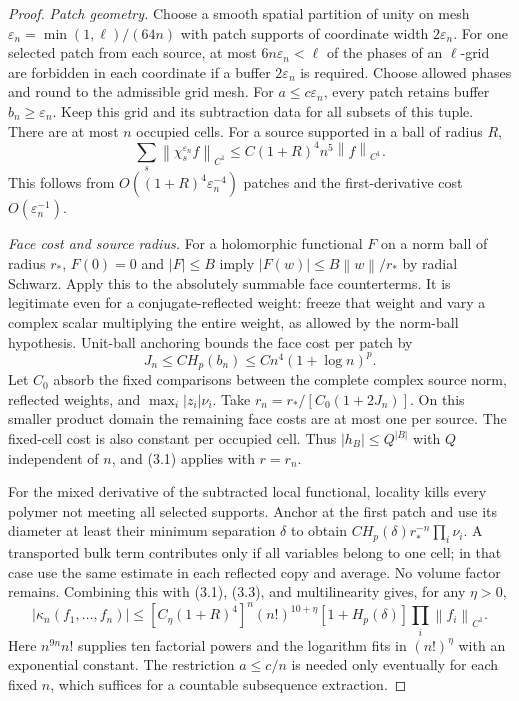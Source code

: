 \documentclass[11pt]{article}
\theoremstyle{remark}
\newcommand{\norm}[1]{\left\|#1\right\|}
\begin{document}
\begin{proof}
\emph{Patch geometry.}
Choose a smooth spatial partition of unity on mesh
$\varepsilon_n=\min(1,\ell)/(64n)$ with patch supports of coordinate
width $2\varepsilon_n$. For one selected patch from each source,
at most $6n\varepsilon_n<\ell$ of the phases of an $\ell$-grid are
forbidden in each coordinate if a buffer $2\varepsilon_n$ is required.
Choose allowed phases and round to the admissible grid mesh. For
$a\leq c\varepsilon_n$, every patch retains buffer
$b_n\geq\varepsilon_n$. Keep this grid and its subtraction data for
all subsets of this tuple. There are at most $n$ occupied cells.
For a source supported in a ball of radius $R$,
\[
 \sum_s\norm{\chi_s^{\varepsilon_n}f}_{C^1}
 \leq C(1+R)^4 n^5\norm f_{C^1}.
 \tag{3.3}
\]
This follows from $O((1+R)^4\varepsilon_n^{-4})$ patches and the
first-derivative cost $O(\varepsilon_n^{-1})$.

\emph{Face cost and source radius.}
For a holomorphic functional $F$ on a norm ball of radius $r_*$,
$F(0)=0$ and $|F|\leq B$ imply
$|F(w)|\leq B\norm w/r_*$ by radial Schwarz.
Apply this to the absolutely summable face counterterms. It is
legitimate even for a conjugate-reflected weight: freeze that weight
and vary a complex scalar multiplying the entire weight, as allowed
by the norm-ball hypothesis. Unit-ball anchoring bounds the face cost
per patch by
\[
 J_n\leq C H_p(b_n)\leq Cn^4(1+\log n)^p.
\]
Let $C_0$ absorb the fixed comparisons between the complete complex
source norm, reflected weights, and $\max_i|z_i|\nu_i$.
Take $r_n=r_*/[C_0(1+2J_n)]$. On this smaller product domain the remaining
face costs are at most one per source. The fixed-cell cost is also
constant per occupied cell. Thus $|h_B|\leq Q^{|B|}$ with $Q$
independent of $n$, and (3.1) applies with $r=r_n$.

For the mixed derivative of the subtracted local functional, locality
kills every polymer not meeting all selected supports. Anchor at the
first patch and use its diameter at least their minimum separation
$\delta$ to obtain $C H_p(\delta)r_*^{-n}\prod_i\nu_i$.
A transported bulk term contributes only if all variables belong to
one cell; in that case use the same estimate in each reflected copy
and average. No volume factor remains.
Combining this with (3.1), (3.3), and multilinearity gives, for any
$\eta>0$,
\[
 |\kappa_n(f_1,\ldots,f_n)|
 \leq[C_\eta(1+R)^4]^n(n!)^{10+\eta}
       [1+H_p(\delta)]\prod_i\norm{f_i}_{C^1}.
 \tag{3.4}
\]
Here $n^{9n}n!$ supplies ten factorial powers and the logarithm fits
in $(n!)^\eta$ with an exponential constant.
The restriction $a\leq c/n$ is needed only eventually for each fixed
$n$, which suffices for a countable subsequence extraction.


\end{proof}
\end{document}
